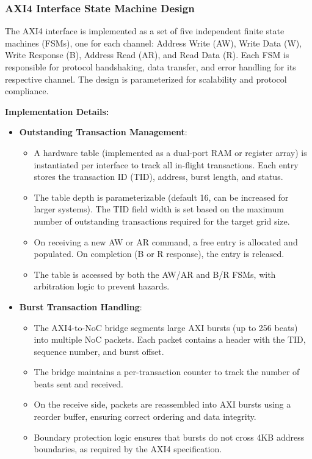 \documentclass[11pt,a4paper]{article}
\begin{document}
\subsubsection{AXI4 Interface State Machine Design}

The AXI4 interface is implemented as a set of five independent finite state machines (FSMs), one for each channel: Address Write (AW), Write Data (W), Write Response (B), Address Read (AR), and Read Data (R). Each FSM is responsible for protocol handshaking, data transfer, and error handling for its respective channel. The design is parameterized for scalability and protocol compliance.

\textbf{Implementation Details:}
\begin{itemize}
    \item \textbf{Outstanding Transaction Management}: 
    \begin{itemize}
        \item A hardware table (implemented as a dual-port RAM or register array) is instantiated per interface to track all in-flight transactions. Each entry stores the transaction ID (TID), address, burst length, and status.
        \item The table depth is parameterizable (default 16, can be increased for larger systems). The TID field width is set based on the maximum number of outstanding transactions required for the target grid size.
        \item On receiving a new AW or AR command, a free entry is allocated and populated. On completion (B or R response), the entry is released.
        \item The table is accessed by both the AW/AR and B/R FSMs, with arbitration logic to prevent hazards.
    \end{itemize}
    \item \textbf{Burst Transaction Handling}:
    \begin{itemize}
        \item The AXI4-to-NoC bridge segments large AXI bursts (up to 256 beats) into multiple NoC packets. Each packet contains a header with the TID, sequence number, and burst offset.
        \item The bridge maintains a per-transaction counter to track the number of beats sent and received.
        \item On the receive side, packets are reassembled into AXI bursts using a reorder buffer, ensuring correct ordering and data integrity.
        \item Boundary protection logic ensures that bursts do not cross 4KB address boundaries, as required by the AXI4 specification.

\end{itemize}
\end{itemize}
\end{document}
